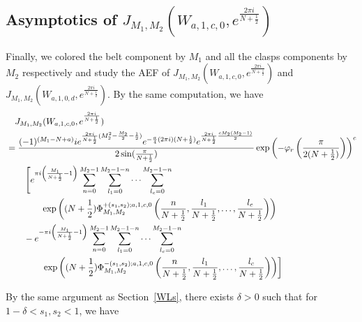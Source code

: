 \documentclass[10pt,a4paper]{article}
\newcommand{\lt}{\left}
\newcommand{\rt}{\right}
\begin{document}
\subsection{Asymptotics of $J_{M_1,M_2}(W_{a,1,c,0},e^{\frac{2\pi i}{N+\frac{1}{2}}})$}
\label{Wa1c0M1M2}
Finally, we colored the belt component by $M_1$ and all the clasps components by $M_2$ respectively and study the AEF of $J_{M_1,M_2}(W_{a,1,c,0},e^{\frac{2\pi i}{N+\frac{1}{2}}})$ and $J_{M_1,M_2}(W_{a,1,0,d},e^{\frac{2\pi i}{N+\frac{1}{2}}})$. By the same computation, we have
\begin{align}
&\quad J_{M_1, M_2} (W_{a,1,c,0}, e^{\frac{2\pi i}{N+\frac{1}{2}}}) \notag  \\
&=   \frac{(-1)^{(M_1 - N+a) } i  e^{\frac{2\pi i}{N+\frac{1}{2}}(M_2^2 - \frac{M_2}{2} - \frac{1}{2})}  e^{- \frac{a}{4}(2\pi i)(N+\frac{1}{2})} e^{\frac{2\pi i}{N+\frac{1}{2}}\frac{cM_2(M_2-1)}{2}}}{2\sin(\frac{\pi}{N+\frac{1}{2}})} 
\exp\lt(  -\varphi_r \lt(  \frac{\pi}{2(N+\frac{1}{2})}\rt)\rt)^{c}\notag\\
&\qquad  \lt[e^{\pi i \lt(\frac{M_1}{N+\frac{1}{2}} - 1\rt) } \sum_{n=0}^{M_2-1} \sum_{l_1=0}^{M_2-1-n}\dots \sum_{l_c=0}^{M_2-1-n}   \rt. \notag \\
&\qquad\qquad \exp\lt( (N+\frac{1}{2})\Phi^{+(s_1,s_2);a,1,c,0}_{M_1,M_2} \lt(\frac{n}{N+\frac{1}{2}},\frac{l_1}{N+\frac{1}{2}}, \dots, \frac{l_c}{N+\frac{1}{2}} \rt) \rt)  \notag \\
&\qquad -e^{-\pi i \lt(\frac{M_1}{N+\frac{1}{2}} - 1\rt) } \sum_{n=0}^{M_2-1} \sum_{l_1=0}^{M_2-1-n}\dots \sum_{l_c=0}^{M_2-1-n}  \notag \\
&\qquad\qquad \lt. \exp\lt( (N+\frac{1}{2})\Phi^{-(s_1,s_2);a,1,c ,0}_{M_1,M_2} \lt(\frac{n}{N+\frac{1}{2}},\frac{l_1}{N+\frac{1}{2}}, \dots, \frac{l_c}{N+\frac{1}{2}}\rt) \rt)  \rt]
\end{align}

By the same argument as Section~\ref{WLs}, there exists $\delta > 0$ such that for $1-\delta < s_1,s_2 < 1$, we have
\end{document}
